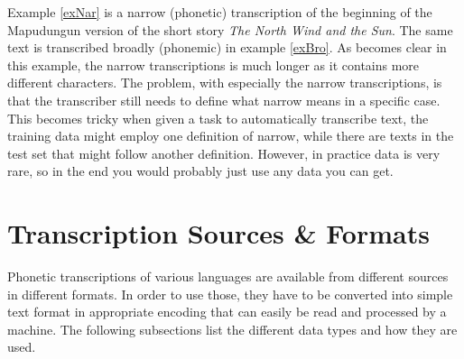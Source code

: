 \begin{covexamples}
\item \label{exNar} 
\item \label{exBro}
\end{covexamples}



Example \ref{exNar} is a narrow (phonetic) transcription of the beginning of the Mapudungun version of the short story \textit{The North Wind and the Sun}. The same text is transcribed broadly (phonemic) in example \ref{exBro}. As becomes clear in this example, the narrow transcriptions is much longer as it contains more different characters. The problem, with especially the narrow transcriptions, is that the transcriber still needs to define what narrow means in a specific case. This becomes tricky when given a task to automatically transcribe text, the training data might employ one definition of narrow, while there are texts in the test set that might follow another definition. However, in practice data is very rare, so in the end you would probably just use any data you can get.


\section{Transcription Sources \& Formats}
Phonetic transcriptions of various languages are available from different sources in different formats. In order to use those, they have to be converted into simple text format in appropriate encoding that can easily be read and processed by a machine. The following subsections list the different data types and how they are used.

